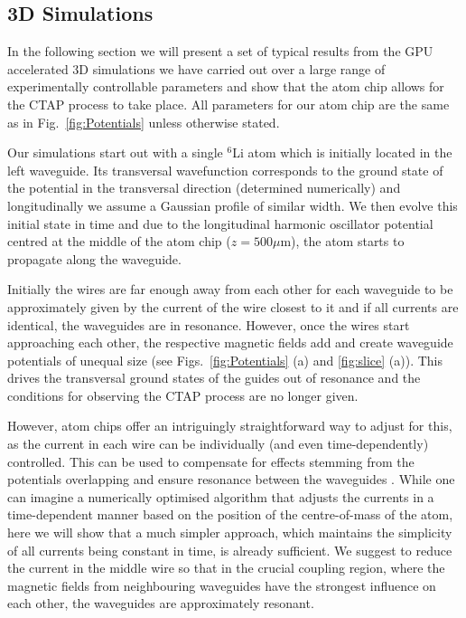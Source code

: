 \subsection{3D Simulations}
\label{sec:Results}
In the following section we will present a set of typical results from the GPU accelerated 3D simulations we have carried out over a large range of experimentally controllable parameters and show that the atom chip allows for the CTAP process to take place. All parameters for our atom chip are the same as in Fig.~\ref{fig:Potentials} unless otherwise stated.

Our simulations start out with a single $^{6}$Li atom which is initially located in the left waveguide. Its transversal wavefunction corresponds to the ground state of the potential in the transversal direction (determined numerically) and longitudinally we assume a Gaussian profile of similar width. We then evolve this initial state in time and due to the longitudinal harmonic oscillator potential centred at the middle of the atom chip ($z=500 \mu$m), the atom starts to propagate along the waveguide.

Initially the wires are far enough away from each other for each waveguide to be approximately given by the current of the wire closest to it and if all currents are identical, the waveguides are in resonance. However, once the wires start approaching each other, the respective magnetic fields add and create waveguide potentials of unequal size (see Figs.~\ref{fig:Potentials} (a) and \ref{fig:slice} (a)). This drives the transversal ground states of the guides out of resonance and the conditions for observing the CTAP process are no longer given.

However, atom chips offer an intriguingly straightforward way to adjust for this, as the current in each wire can be individually (and even time-dependently) controlled. This can be used to compensate for effects stemming from the potentials overlapping and ensure resonance between the waveguides \cite{OSullivan:10}. While one can imagine a numerically optimised algorithm that adjusts the currents in a time-dependent manner based on the position of the centre-of-mass of the atom, here we will show that a much simpler approach, which maintains the simplicity of all currents being constant in time, is already sufficient. We suggest to reduce the current in the middle wire so that in the crucial coupling region, where the magnetic fields from neighbouring waveguides have the strongest influence on each other, the waveguides are approximately resonant.

